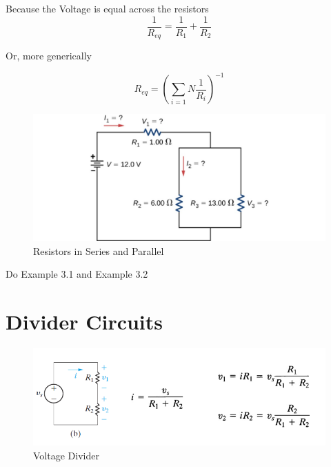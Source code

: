 \documentclass[14pt]{memoir}
\begin{document}
Because the Voltage is equal across the resistors
\begin{equation}
\frac{1}{R_{eq}} = \frac{1}{R_1} + \frac{1}{R_2}
\end{equation}

Or, more generically

\begin{equation}
R_{eq} = (\sum_{i=1}{N} \frac{1}{R_i})^{-1}
\end{equation}



\begin{figure}[H]
\begin{center}
\includegraphics[scale=0.50]{fig/fig_10_16.jpg}
\caption{Resistors in Series and Parallel}
\label{fig:10_16}
\end{center}
\end{figure}

\begin{tcolorbox}
Do Example 3.1 and Example 3.2
\end{tcolorbox}



\section{Divider Circuits}

\begin{figure}[H]
\begin{center}
\includegraphics[scale=0.50]{fig/fig03_14.png}
\caption{Voltage Divider}
\label{fig:fig03_14}
\end{center}
\end{figure}
\end{document}
